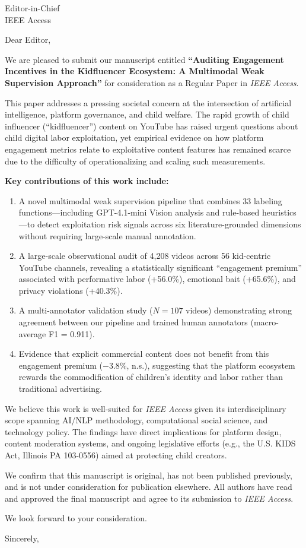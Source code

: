 \documentclass[11pt]{letter}
\begin{document}
\begin{letter}{Editor-in-Chief\\IEEE Access}

\opening{Dear Editor,}

We are pleased to submit our manuscript entitled \textbf{``Auditing Engagement Incentives in the Kidfluencer Ecosystem: A Multimodal Weak Supervision Approach''} for consideration as a Regular Paper in \textit{IEEE Access}.

This paper addresses a pressing societal concern at the intersection of artificial intelligence, platform governance, and child welfare. The rapid growth of child influencer (``kidfluencer'') content on YouTube has raised urgent questions about child digital labor exploitation, yet empirical evidence on how platform engagement metrics relate to exploitative content features has remained scarce due to the difficulty of operationalizing and scaling such measurements.

\textbf{Key contributions of this work include:}

\begin{enumerate}
    \item A novel multimodal weak supervision pipeline that combines 33 labeling functions---including GPT-4.1-mini Vision analysis and rule-based heuristics---to detect exploitation risk signals across six literature-grounded dimensions without requiring large-scale manual annotation.
    \item A large-scale observational audit of 4,208 videos across 56 kid-centric YouTube channels, revealing a statistically significant ``engagement premium'' associated with performative labor (+56.0\%), emotional bait (+65.6\%), and privacy violations (+40.3\%).
    \item A multi-annotator validation study ($N=107$ videos) demonstrating strong agreement between our pipeline and trained human annotators (macro-average F1 = 0.911).
    \item Evidence that explicit commercial content does not benefit from this engagement premium ($-3.8\%$, n.s.), suggesting that the platform ecosystem rewards the commodification of children's identity and labor rather than traditional advertising.
\end{enumerate}

We believe this work is well-suited for \textit{IEEE Access} given its interdisciplinary scope spanning AI/NLP methodology, computational social science, and technology policy. The findings have direct implications for platform design, content moderation systems, and ongoing legislative efforts (e.g., the U.S. KIDS Act, Illinois PA 103-0556) aimed at protecting child creators.

We confirm that this manuscript is original, has not been published previously, and is not under consideration for publication elsewhere. All authors have read and approved the final manuscript and agree to its submission to \textit{IEEE Access}.

We look forward to your consideration.

\closing{Sincerely,}

\end{letter}
\end{document}

